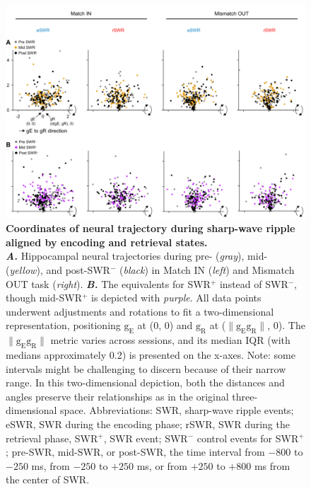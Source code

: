 \documentclass[final,3p,times,twocolumn]{elsarticle}
\begin{document}
        \begin{figure}[ht]
        	\centering
            \includegraphics[width=1\textwidth]{./media/figures/.png/Figure_ID_06.png}
        	\caption{\textbf{
Coordinates of neural trajectory during sharp-wave ripple aligned by encoding and retrieval states.
}
\smallskip
\\
\textbf{\textit{A.}} Hippocampal neural trajectories during pre- (\textit{gray}), mid- (\textit{yellow}), and post-SWR$^-$ (\textit{black}) in Match IN (\textit{left}) and Mismatch OUT task (\textit{right}). \textbf{\textit{B.}} The equivalents for SWR$^+$ instead of SWR$^-$, though mid-SWR$^+$ is depicted with \textit{purple}. All data points underwent adjustments and rotations to fit a two-dimensional representation, positioning $\mathrm{g_{E}}$ at (0, 0) and $\mathrm{g_{R}}$ at ($\lVert \mathrm{g_{E}g_{R}} \rVert$, 0). The $\lVert \mathrm{g_{E}g_{R}} \rVert$ metric varies across sessions, and its median \textpm IQR (with medians approximately 0.2) is presented on the x-axes. Note: some intervals might be challenging to discern because of their narrow range. In this two-dimensional depiction, both the distances and angles preserve their relationships as in the original three-dimensional space. Abbreviations: SWR, sharp-wave ripple events; eSWR, SWR during the encoding phase; rSWR, SWR during the retrieval phase, SWR$^+$, SWR event; SWR$^-$ control events for SWR$^+$; pre-SWR, mid-SWR, or post-SWR, the time interval from $-800$ to $-250$ ms, from $-250$ to $+250$ ms, or from $+250$ to $+800$ ms from the center of SWR.
}
        	\label{fig:06}
        \end{figure}
\end{document}
